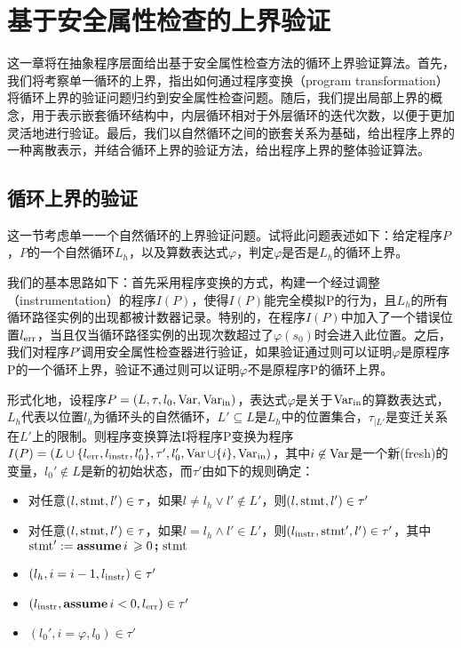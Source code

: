 
\chapter{基于安全属性检查的上界验证}

这一章将在抽象程序层面给出基于安全属性检查方法的循环上界验证算法。首先，我们将考察单一循环的上界，指出如何通过程序变换（program
transformation）将循环上界的验证问题归约到安全属性检查问题。随后，我们提出局部上界的概念，用于表示嵌套循环结构中，内层循环相对于外层循环的迭代次数，以便于更加灵活地进行验证。最后，我们以自然循环之间的嵌套关系为基础，给出程序上界的一种离散表示，并结合循环上界的验证方法，给出程序上界的整体验证算法。

\section{循环上界的验证}

\label{section:chap3-global-verif}

这一节考虑单一一个自然循环的上界验证问题。试将此问题表述如下：给定程序$P$，$P$的一个自然循环$L_h$，以及算数表达式$\varphi$，判定$\varphi$是否是$L_h$的循环上界。

我们的基本思路如下：首先采用程序变换的方式，构建一个经过调整（instrumentation）的程序$I
(P)$，使得$I
(P)$能完全模拟P的行为，且$L_h$的所有循环路径实例的出现都被计数器记录。特别的，在程序$I\left(P\right)$中加入了一个错误位置$l_{\operatorname{err}}$，当且仅当循环路径实例的出现次数超过了$\varphi
(s_0)$时会进入此位置。之后，我们对程序$P'$调用安全属性检查器进行验证，如果验证通过则可以证明$\varphi$是原程序P的一个循环上界，验证不通过则可以证明$\varphi$不是原程序P的循环上界。

形式化地，设程序$P = (L, \tau, l_0, \operatorname{Var},
\operatorname{Var}_{\operatorname{in}})$，表达式$\varphi$是关于$\operatorname{Var}_{\operatorname{in}}$的算数表达式，$L_h$代表以位置$l_h$为循环头的自然循环，$L'
\subseteq
L$是$L_h$中的位置集合，$\tau_{|L'}$是变迁关系在$L'$上的限制。则程序变换算法I将程序P变换为程序$I
(P) = (L \cup \{ l_{\operatorname{err}}, l_{\operatorname{instr}}, l_0' \}, \tau', l_0',
\operatorname{Var} \cup \{ i \}, \operatorname{Var}_{\operatorname{in}})$，其中$i \not\in
\operatorname{Var}$是一个新(fresh)的变量，$l_0' \nin
L$是新的初始状态，而$\tau'$由如下的规则确定：
\begin{itemize}
  \item 对任意$(l, \operatorname{stmt}, l') \in \tau$，如果$l \neq l_h \vee l'
  \nin L'$，则$(l, \operatorname{stmt}, l') \in \tau'$
  
  \item 对任意$(l, \operatorname{stmt}, l') \in \tau$，如果$l = l_h \wedge l'
  \in L'$，则$(l_{\operatorname{instr}}, \operatorname{stmt}', l') \in
  \tau'$，其中$\operatorname{stmt}' := \textbf{assume}\, i \, \geqslant 0
  \, \textbf{;} \, \operatorname{stmt}$
  
  \item $(l_h, i = i - 1, l_{\operatorname{instr}}) \in \tau'$
  
  \item $(l_{\operatorname{instr}}, \textbf{assume} \, i < 0, l_{\operatorname{err}})
  \in \tau'$
  
  \item $(l_0', i = \varphi, l_0) \in \tau'$
\end{itemize}


